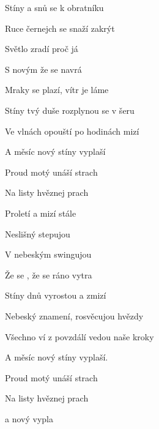 

           

\zs
Stíny  a snů se k obratníku 

Ruce  černejch se snaží zakrýt 

Světlo zradí proč já 

S novým  že se  navrá
\ks

\zs
Mraky se plazí, vítr je láme

Stíny tvý duše rozplynou se v šeru

Ve vlnách opouští po hodinách mizí

A měsíc nový stíny vyplaší
\ks

\zr
Proud motý unáší strach

Na listy  hvěznej prach

Proletí  a mizí stále 

Neslišný  stepujou

V nebeským  swingujou

Že se , že se ráno vytra
\kr

\zs
Stíny dnů vyrostou a zmizí

Nebeský znamení, rosvěcujou hvězdy

Všechno ví z povzdálí vedou naše kroky

A měsíc nový stíny vyplaší.
\ks

\zr  \kr

\zr
Proud motý unáší strach

Na listy  hvěznej prach

a nový  vypla
\kr

\kp





